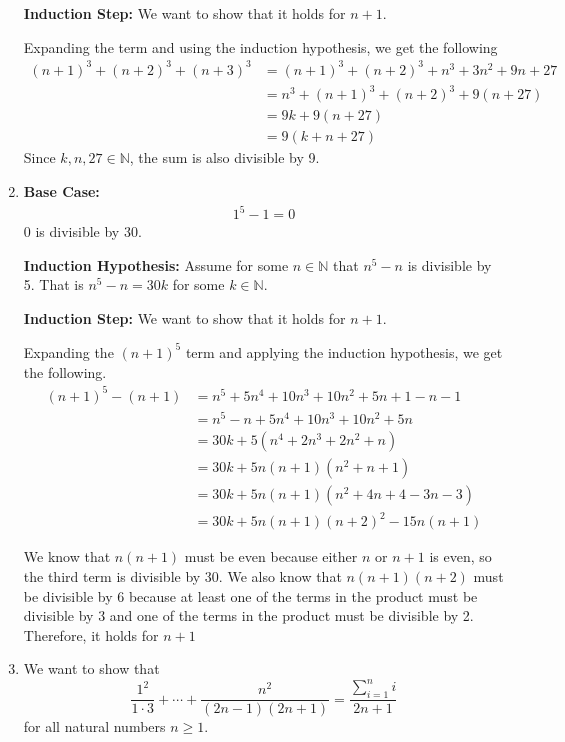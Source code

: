 \documentclass[12pt]{article}
\begin{document}
\begin{enumerate}[start=1,label={\bfseries Exercise \arabic*:},leftmargin=1in]
    \textbf{Induction Step:} We want to show that it holds for $n+1$. 

    Expanding the term and using the induction hypothesis, we get the following
    \begin{align*}
        (n+1)^3 + (n+2)^3 + (n+3)^3 &= (n+1)^3 + (n+2)^3 + n^3 + 3n^2 + 9n + 27 \\
        &= n^3 + (n+1)^3 + (n+2)^3 + 9(n + 27) \\ 
        &= 9k + 9(n + 27) \\
        &= 9(k + n + 27)
    \end{align*}
    Since $k, n, 27 \in \mathbb{N}$, the sum is also divisible by 9.
    \item \textbf{Base Case:}
    \begin{align*}
        1^5 - 1 = 0
    \end{align*}
    0 is divisible by 30. 

    \textbf{Induction Hypothesis:} Assume for some $n \in \mathbb{N}$ that $n^5 - n$ is divisible by 5.
    That is $n^5 - n = 30k$ for some $k \in \mathbb{N}$.

    \textbf{Induction Step:} We want to show that it holds for $n + 1$.
    
    Expanding the $(n+1)^5$ term and applying the induction hypothesis, we get the following.
    \begin{align*}
        (n+1)^5 - (n+1) &= n^5 + 5n^4 + 10n^3 + 10n^2 + 5n + 1 - n - 1 \\
        &= n^5 - n + 5n^4 + 10n^3 + 10n^2 + 5n \\
        &= 30k + 5(n^4 + 2n^3 + 2n^2 + n)\\
        &= 30k + 5n(n+1)(n^2+n+1) \\
        &= 30k + 5n(n+1)(n^2 + 4n + 4 - 3n - 3)\\
        &= 30k + 5n(n+1)(n+2)^2 - 15n(n+1)
    \end{align*} 
    
    We know that $n(n+1)$ must be even because either $n$ or $n+1$ is even, so the third term is divisible by 30.
    We also know that $n(n+1)(n+2)$ must be divisible by 6 because at least one of the terms in the product must be divisible by 3 and one of the terms in the product must be divisible by 2. 
    Therefore, it holds for $n+1$

    \item We want to show that 
    \[
        \frac{1^2}{1\cdot 3} + \cdots + \frac{n^2}{(2n-1)(2n+1)} = \frac{\sum^n_{i=1}i}{2n + 1}
    \]
    for all natural numbers $n \geq 1$.


\end{enumerate}
\end{document}
